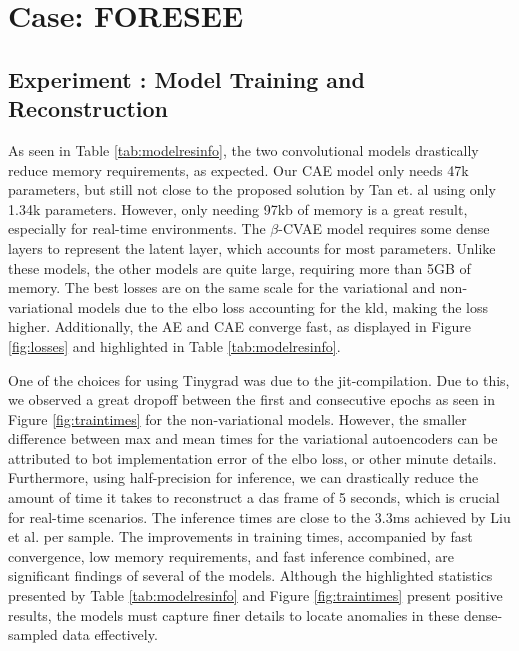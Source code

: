 \section{Case: FORESEE}
\label{disc:foresee}

\subsection{Experiment : Model Training and Reconstruction}

As seen in Table \ref{tab:modelresinfo}, the two convolutional models drastically reduce memory requirements, as expected. Our CAE model only needs 47k parameters, but still not close to the proposed solution by Tan et. al \cite{tan2023improving} using only 1.34k parameters. However, only needing 97kb of memory is a great result, especially for real-time environments. The $\beta$-CVAE model requires some dense layers to represent the latent layer, which accounts for most parameters. Unlike these models, the other models are quite large, requiring more than 5GB of memory. The best losses are on the same scale for the variational and non-variational models due to the \acrshort{elbo} loss accounting for the \acrshort{kld}, making the loss higher. Additionally, the AE and CAE converge fast, as displayed in Figure \ref{fig:losses} and highlighted in Table \ref{tab:modelresinfo}. 

One of the choices for using Tinygrad was due to the \acrshort{jit}-compilation. Due to this, we observed a great dropoff between the first and consecutive epochs as seen in Figure \ref{fig:traintimes} for the non-variational models. However, the smaller difference between max and mean times for the variational autoencoders can be attributed to bot implementation error of the \acrshort{elbo} loss, or other minute details. Furthermore, using half-precision for inference, we can drastically reduce the amount of time it takes to reconstruct a \acrshort{das} frame of 5 seconds, which is crucial for real-time scenarios. The inference times are close to the 3.3ms achieved by Liu et al. \cite{photonics9100677} per sample. The improvements in training times, accompanied by fast convergence, low memory requirements, and fast inference combined, are significant findings of several of the models. Although the highlighted statistics presented by Table \ref{tab:modelresinfo} and Figure \ref{fig:traintimes} present positive results, the models must capture finer details to locate anomalies in these dense-sampled data effectively. 

